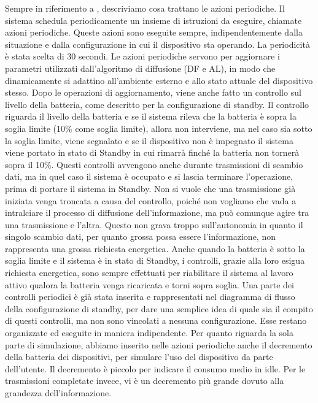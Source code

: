 Sempre in riferimento a , descriviamo cosa trattano le azioni periodiche. Il sistema schedula periodicamente un insieme di istruzioni da eseguire, chiamate azioni periodiche. Queste azioni sono eseguite sempre, indipendentemente dalla situazione e dalla configurazione in cui il dispositivo sta operando. La periodicità è stata scelta di 30 secondi. Le azioni periodiche servono per aggiornare i parametri utilizzati dall'algoritmo di diffusione (\acs{DF} e \acs{AL}), in modo che dinamicamente si adattino all'ambiente esterno e allo stato attuale del dispositivo stesso. Dopo le operazioni di aggiornamento, viene anche fatto un controllo sul livello della batteria, come descritto per la configurazione di standby. Il controllo riguarda il livello della batteria e se il sistema rileva che la batteria è sopra la soglia limite (10\% come soglia limite), allora non interviene, ma nel caso sia sotto la soglia limite, viene segnalato e se il dispositivo non è impegnato il sistema viene portato in stato di Standby in cui rimarrà finché la batteria non tornerà sopra il 10\%. Questi controlli avvengono anche durante trasmissioni di scambio dati, ma in quel caso il sistema è occupato e si lascia terminare l'operazione, prima di portare il sistema in Standby. Non si vuole che una trasmissione già iniziata venga troncata a causa del controllo, poiché non vogliamo che vada a intralciare il processo di diffusione dell'informazione, ma può comunque agire tra una trasmissione e l'altra. Questo non grava troppo sull'autonomia in quanto il singolo scambio dati, per quanto grossa possa essere l'informazione, non rappresenta una grossa richiesta energetica. Anche quando la batteria è sotto la soglia limite e il sistema è in stato di Standby, i controlli, grazie alla loro esigua richiesta energetica, sono sempre effettuati per riabilitare il sistema al lavoro attivo qualora la batteria venga ricaricata e torni sopra soglia. Una parte dei controlli periodici è già stata inserita e rappresentati nel diagramma di flusso della configurazione di standby, per dare una semplice idea di quale sia il compito di questi controlli, ma non sono vincolati a nessuna configurazione. Esse restano organizzate ed eseguite in maniera indipendente. Per quanto riguarda la sola parte di simulazione, abbiamo inserito nelle azioni periodiche anche il decremento della batteria dei dispositivi, per simulare l'uso del dispositivo da parte dell'utente. Il decremento è piccolo per indicare il consumo medio in idle. Per le trasmissioni completate invece, vi è un decremento più grande dovuto alla grandezza dell'informazione.
\bigskip

